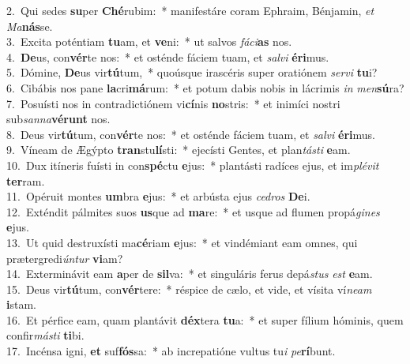 {2.~}Qui sedes \textbf{su}per \textbf{Ché}rubim:~* manifestáre coram Ephraim, Bénjamin, \textit{et} \textit{Ma}\textbf{nás}se.\\
{3.~}Excita poténtiam \textbf{tu}am, et \textbf{ve}ni:~* ut salvos \textit{fá}\textit{ci}\textbf{as} nos.\\
{4.~}\textbf{De}us, con\textbf{vér}te nos:~* et osténde fáciem tuam, et \textit{sal}\textit{vi} \textbf{é}\textbf{ri}mus.\\
{5.~}Dómine, \textbf{De}us vir\textbf{tú}tum,~* quoúsque irascéris super oratiónem \textit{ser}\textit{vi} \textbf{tu}i?\\
{6.~}Cibábis nos pane \textbf{la}cri\textbf{má}rum:~* et potum dabis nobis in lácrimis \textit{in} \textit{men}\textbf{sú}ra?\\
{7.~}Posuísti nos in contradictiónem vi\textbf{cí}nis \textbf{no}stris:~* et inimíci nostri sub\textit{san}\textit{na}\textbf{vé}\textbf{runt} nos.\\
{8.~}Deus vir\textbf{tú}tum, con\textbf{vér}te nos:~* et osténde fáciem tuam, et \textit{sal}\textit{vi} \textbf{é}\textbf{ri}mus.\\
{9.~}Víneam de Ægýpto \textbf{tran}stu\textbf{lí}sti:~* ejecísti Gentes, et plan\textit{tá}\textit{sti} \textbf{e}am.\\
{10.~}Dux itíneris fuísti in con\textbf{spé}ctu \textbf{e}jus:~* plantásti radíces ejus, et im\textit{plé}\textit{vit} \textbf{ter}ram.\\
{11.~}Opéruit montes \textbf{um}bra \textbf{e}jus:~* et arbústa ejus \textit{ce}\textit{dros} \textbf{De}i.\\
{12.~}Exténdit pálmites suos \textbf{us}que ad \textbf{ma}re:~* et usque ad flumen propá\textit{gi}\textit{nes} \textbf{e}jus.\\
{13.~}Ut quid destruxísti ma\textbf{cé}riam \textbf{e}jus:~* et vindémiant eam omnes, qui prætergredi\textit{ún}\textit{tur} \textbf{vi}am?\\
{14.~}Exterminávit eam \textbf{a}per de \textbf{sil}va:~* et singuláris ferus depá\textit{stus} \textit{est} \textbf{e}am.\\
{15.~}Deus vir\textbf{tú}tum, con\textbf{vér}tere:~* réspice de cælo, et vide, et vísita ví\textit{ne}\textit{am} \textbf{i}stam.\\
{16.~}Et pérfice eam, quam plantávit \textbf{déx}tera \textbf{tu}a:~* et super fílium hóminis, quem confir\textit{má}\textit{sti} \textbf{ti}bi.\\
{17.~}Incénsa igni, \textbf{et} suf\textbf{fós}sa:~* ab increpatióne vultus tu\textit{i} \textit{pe}\textbf{rí}bunt.\\
